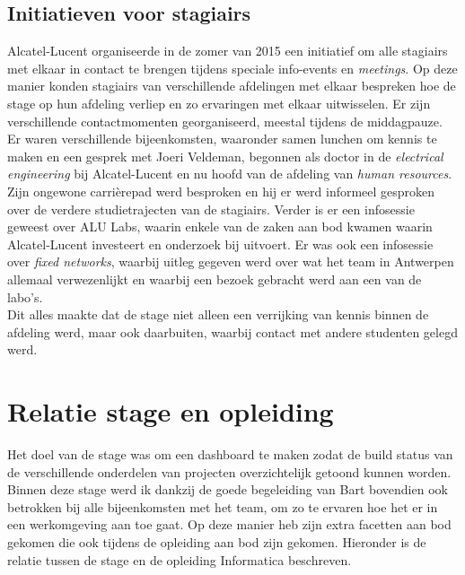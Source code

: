 \documentclass[10pt,a4paper]{article}
\begin{document}
\subsection{Initiatieven voor stagiairs}
\label{interns}
Alcatel-Lucent organiseerde in de zomer van 2015 een initiatief om alle stagiairs met elkaar in contact te brengen tijdens speciale info-events en \textit{meetings}. Op deze manier konden stagiairs van verschillende afdelingen met elkaar bespreken hoe de stage op hun afdeling verliep en zo ervaringen met elkaar uitwisselen. Er zijn verschillende contactmomenten georganiseerd, meestal tijdens de middagpauze. Er waren verschillende bijeenkomsten, waaronder samen lunchen om kennis te maken en een gesprek met Joeri Veldeman, begonnen als doctor in de \textit{electrical engineering} bij Alcatel-Lucent en nu hoofd van de afdeling van \textit{human resources}. Zijn ongewone carri\`erepad werd besproken en hij er werd informeel gesproken over de verdere studietrajecten van de stagiairs.
Verder is er een infosessie geweest over ALU Labs, waarin enkele van de zaken aan bod kwamen waarin Alcatel-Lucent investeert en onderzoek bij uitvoert. Er was ook een infosessie over \textit{fixed networks}, waarbij uitleg gegeven werd over wat het team in Antwerpen allemaal verwezenlijkt en waarbij een bezoek gebracht werd aan een van de labo's.\\
Dit alles maakte dat de stage niet alleen een verrijking van kennis binnen de afdeling werd, maar ook daarbuiten, waarbij contact met andere studenten gelegd werd.

\section{Relatie stage en opleiding}
\label{relatie}
Het doel van de stage was om een dashboard te maken zodat de build status 
van de verschillende onderdelen van projecten overzichtelijk getoond kunnen worden. Binnen deze stage werd ik dankzij de goede begeleiding van Bart bovendien ook betrokken bij alle bijeenkomsten
met het team, om zo te ervaren hoe het er in een werkomgeving aan toe
gaat. Op deze manier heb zijn extra facetten aan bod gekomen die ook tijdens
de opleiding aan bod zijn gekomen. Hieronder is de relatie tussen de stage en de opleiding Informatica beschreven.
\end{document}
